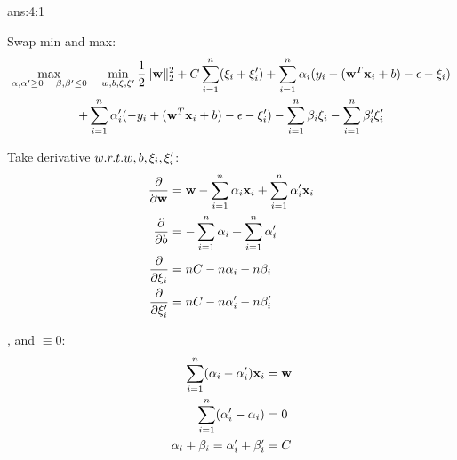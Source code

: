 \documentclass{tron}
\begin{document}
\begin{answer}{ans:4:1}
	
	Swap min and max:
	\begin{multline}\label{eqn:lagrangian}
		\max_{\alpha, \alpha' \geq 0  \quad \beta, \beta' \leq 0} \quad \min_{w, b, \xi, \xi'} \frac12 \| \mathbf{w}\|_2^2 + C\sum_{i=1}^n (\xi_i + \xi_i') 
		 + \sum_{i=1}^n \alpha_i (y_i -(\mathbf{w}^T \mathbf{x}_i + b) - \epsilon - \xi_i)  \\
		+ \sum_{i=1}^n \alpha_i' (- y_i + (\mathbf{w}^T \mathbf{x}_i + b) - \epsilon - \xi_i' ) 
		- \sum_{i=1}^n \beta_i \xi_i - \sum_{i=1}^n \beta_i' \xi_i' 
	\end{multline}
	
	Take derivative ${w.r.t.} w,b,\xi_i,\xi_i'$:
	\begin{align}
		\frac{\partial}{\partial \mathbf{w}} &= \mathbf{w} - \sum_{i=1}^n \alpha_i \mathbf{x}_i + \sum_{i=1}^n \alpha_i' \mathbf{x}_i\\
		\frac{\partial}{\partial b} &= - \sum_{i=1}^n \alpha_i + \sum_{i=1}^n \alpha_i'  \\
		\frac{\partial}{\partial \xi_i} & =nC - n\alpha_i - n\beta_i \\
		\frac{\partial}{\partial \xi_i'} & = nC - n\alpha_i' - n\beta_i' 
	\end{align}
	
	, and $\equiv 0$:
	\begin{align}
		\sum_{i=1}^n (\alpha_i  -  \alpha_i') \mathbf{x}_i & = \mathbf{w} \\
		\sum_{i=1}^n (\alpha_i' - \alpha_i) & = 0\\		
		\alpha_i + \beta_i = \alpha_i' + \beta_i' & = C
	\end{align}


\end{answer}
\end{document}

